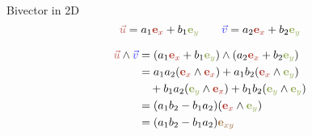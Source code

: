 \begin{frame}{Bivector in 2D}
    \Large
    \[
        \textcolor{u}{\vec{u}} = a_1 \textcolor{red}{\mathbf{e}_x} + b_1 \textcolor{green}{\mathbf{e}_y}
        \qquad
        \textcolor{v}{\vec{v}} = a_2 \textcolor{red}{\mathbf{e}_x} + b_2 \textcolor{green}{\mathbf{e}_y}
    \]

    \begin{align*}
        \textcolor{u}{\vec{u}} \wedge \textcolor{v}{\vec{v}}
         & = (a_1 \textcolor{red}{\mathbf{e}_x} + b_1 \textcolor{green}{\mathbf{e}_y}) \wedge (a_2 \textcolor{red}{\mathbf{e}_x} + b_2 \textcolor{green}{\mathbf{e}_y}) \\
         & = a_1 a_2 (\textcolor{red}{\mathbf{e}_x} \wedge \textcolor{red}{\mathbf{e}_x})
        + a_1 b_2 (\textcolor{red}{\mathbf{e}_x} \wedge \textcolor{green}{\mathbf{e}_y})                                                                                \\
         & \quad + b_1 a_2 (\textcolor{green}{\mathbf{e}_y} \wedge \textcolor{red}{\mathbf{e}_x})
        + b_1 b_2 (\textcolor{green}{\mathbf{e}_y} \wedge \textcolor{green}{\mathbf{e}_y})                                                                              \\
         & = (a_1 b_2 - b_1 a_2)(\textcolor{red}{\mathbf{e}_x} \wedge \textcolor{green}{\mathbf{e}_y})                                                                  \\
         & = (a_1 b_2 - b_1 a_2) \textcolor{midredgreen}{\mathbf{e}_{xy}}
    \end{align*}
\end{frame}


